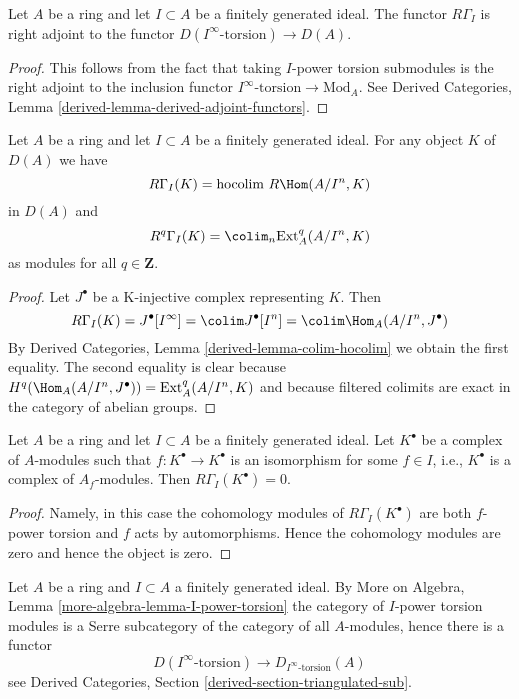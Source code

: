 \begin{lemma}
\label{lemma-adjoint}
Let $A$ be a ring and let $I \subset A$ be a finitely generated ideal.
The functor $R\Gamma_I$ is right adjoint to the functor
$D(I^\infty\text{-torsion}) \to D(A)$.
\end{lemma}

\begin{proof}
This follows from the fact that taking $I$-power torsion submodules
is the right adjoint to the inclusion functor
$I^\infty\text{-torsion} \to \text{Mod}_A$. See
Derived Categories, Lemma \ref{derived-lemma-derived-adjoint-functors}.
\end{proof}

\begin{lemma}
\label{lemma-local-cohomology-ext}
Let $A$ be a ring and let $I \subset A$ be a finitely generated ideal.
For any object $K$ of $D(A)$ we have
$$
R\Gamma_I(K) = \text{hocolim}\ R\Hom(A/I^n, K)
$$
in $D(A)$ and
$$
R^q\Gamma_I(K) = \colim_n \text{Ext}_A^q(A/I^n, K)
$$
as modules for all $q \in \mathbf{Z}$.
\end{lemma}

\begin{proof}
Let $J^\bullet$ be a K-injective complex representing $K$.
Then
$$
R\Gamma_I(K) = J^\bullet[I^\infty] = \colim J^\bullet[I^n] =
\colim \Hom_A(A/I^n, J^\bullet)
$$
By Derived Categories, Lemma \ref{derived-lemma-colim-hocolim}
we obtain the first equality. The second equality is clear
because $H^q(\Hom_A(A/I^n, J^\bullet)) = \text{Ext}^q_A(A/I^n, K)$
and because filtered colimits are exact in the category of abelian
groups.
\end{proof}

\begin{lemma}
\label{lemma-bad-local-cohomology-vanishes}
Let $A$ be a ring and let $I \subset A$ be a finitely generated ideal.
Let $K^\bullet$ be a complex of $A$-modules such that
$f : K^\bullet \to K^\bullet$ is an isomorphism for some
$f \in I$, i.e., $K^\bullet$ is a complex of $A_f$-modules. Then
$R\Gamma_I(K^\bullet) = 0$.
\end{lemma}

\begin{proof}
Namely, in this case the cohomology modules of $R\Gamma_I(K^\bullet)$
are both $f$-power torsion and $f$ acts by automorphisms. Hence the
cohomology modules are zero and hence the object is zero.
\end{proof}

\noindent
Let $A$ be a ring and $I \subset A$ a finitely generated ideal.
By More on Algebra, Lemma \ref{more-algebra-lemma-I-power-torsion}
the category of $I$-power torsion modules is a Serre subcategory
of the category of all $A$-modules, hence there is a functor
\begin{equation}
\label{equation-compare-torsion}
D(I^\infty\text{-torsion}) \to D_{I^\infty\text{-torsion}}(A)
\end{equation}
see Derived Categories, Section \ref{derived-section-triangulated-sub}.

